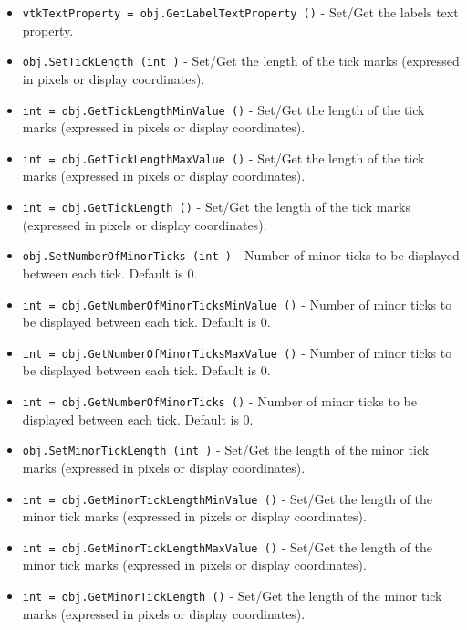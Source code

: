\begin{itemize}
\item  \verb|vtkTextProperty = obj.GetLabelTextProperty ()| -  Set/Get the labels text property.

\item  \verb|obj.SetTickLength (int )| -  Set/Get the length of the tick marks (expressed in pixels or display
 coordinates). 

\item  \verb|int = obj.GetTickLengthMinValue ()| -  Set/Get the length of the tick marks (expressed in pixels or display
 coordinates). 

\item  \verb|int = obj.GetTickLengthMaxValue ()| -  Set/Get the length of the tick marks (expressed in pixels or display
 coordinates). 

\item  \verb|int = obj.GetTickLength ()| -  Set/Get the length of the tick marks (expressed in pixels or display
 coordinates). 

\item  \verb|obj.SetNumberOfMinorTicks (int )| -  Number of minor ticks to be displayed between each tick. Default
 is 0.

\item  \verb|int = obj.GetNumberOfMinorTicksMinValue ()| -  Number of minor ticks to be displayed between each tick. Default
 is 0.

\item  \verb|int = obj.GetNumberOfMinorTicksMaxValue ()| -  Number of minor ticks to be displayed between each tick. Default
 is 0.

\item  \verb|int = obj.GetNumberOfMinorTicks ()| -  Number of minor ticks to be displayed between each tick. Default
 is 0.

\item  \verb|obj.SetMinorTickLength (int )| -  Set/Get the length of the minor tick marks (expressed in pixels or
 display coordinates).

\item  \verb|int = obj.GetMinorTickLengthMinValue ()| -  Set/Get the length of the minor tick marks (expressed in pixels or
 display coordinates).

\item  \verb|int = obj.GetMinorTickLengthMaxValue ()| -  Set/Get the length of the minor tick marks (expressed in pixels or
 display coordinates).

\item  \verb|int = obj.GetMinorTickLength ()| -  Set/Get the length of the minor tick marks (expressed in pixels or
 display coordinates).


\end{itemize}
